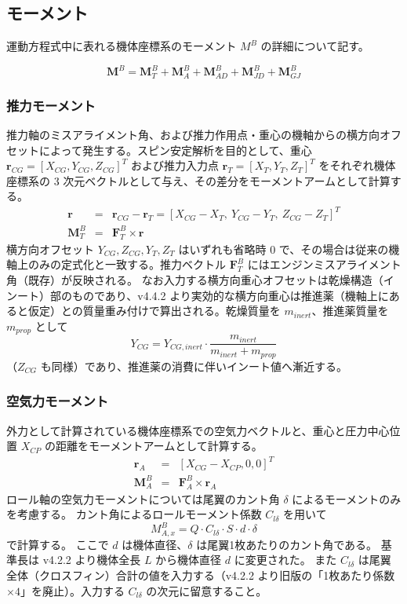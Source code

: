 ﻿\documentclass[a4paper]{jsarticle}
\begin{document}
\subsection{モーメント}
運動方程式中に表れる機体座標系のモーメント $M^B$ の詳細について記す。

\begin{equation}
\bm{M}^B = \bm{M}^B_T + \bm{M}^B_A + \bm{M}^B_{AD} + \bm{M}^B_{JD} + \bm{M}^B_{GJ}
\end{equation}

\subsubsection{推力モーメント}
推力軸のミスアライメント角、および推力作用点・重心の機軸からの横方向オフセットによって発生する。スピン安定解析を目的として、重心 $\bm{r}_{CG} = [X_{CG}, Y_{CG}, Z_{CG}]^T$ および推力入力点 $\bm{r}_T = [X_T, Y_T, Z_T]^T$ をそれぞれ機体座標系の 3 次元ベクトルとして与え、その差分をモーメントアームとして計算する。
\begin{eqnarray}
\bm{r} &=& \bm{r}_{CG} - \bm{r}_T = [X_{CG} - X_T,\ Y_{CG} - Y_T,\ Z_{CG} - Z_T]^T \\
\bm{M}^B_T &=& \bm{F}^B_T \times \bm{r}
\end{eqnarray}
横方向オフセット $Y_{CG}, Z_{CG}, Y_T, Z_T$ はいずれも省略時 0 で、その場合は従来の機軸上のみの定式化と一致する。推力ベクトル $\bm{F}^B_T$ にはエンジンミスアライメント角（既存）が反映される。
なお入力する横方向重心オフセットは乾燥構造（インート）部のものであり、v4.4.2 より実効的な横方向重心は推進薬（機軸上にあると仮定）との質量重み付けで算出される。乾燥質量を $m_{inert}$、推進薬質量を $m_{prop}$ として
\begin{equation}
Y_{CG} = Y_{CG,inert} \cdot \frac{m_{inert}}{m_{inert} + m_{prop}}
\end{equation}
（$Z_{CG}$ も同様）であり、推進薬の消費に伴いインート値へ漸近する。

\subsubsection{空気力モーメント}
外力として計算されている機体座標系での空気力ベクトルと、重心と圧力中心位置 $X_{CP}$ の距離をモーメントアームとして計算する。
\begin{eqnarray}
\bm{r}_A &=& [X_{CG} - X_{CP}, 0, 0]^T \\
\bm{M}^B_A &=& \bm{F}^B_A \times \bm{r}_A
\end{eqnarray}
ロール軸の空気力モーメントについては尾翼のカント角 $\delta$ によるモーメントのみを考慮する。
カント角によるロールモーメント係数 $C_{l\delta}$ を用いて
\begin{equation}
M^B_{A,x} = Q \cdot C_{l\delta} \cdot S \cdot d \cdot \delta
\end{equation}
で計算する。
ここで $d$ は機体直径、$\delta$ は尾翼1枚あたりのカント角である。
基準長は v4.2.2 より機体全長 $L$ から機体直径 $d$ に変更された。
また $C_{l\delta}$ は尾翼全体（クロスフィン）合計の値を入力する（v4.2.2 より旧版の「1枚あたり係数 $\times 4$」を廃止）。入力する $C_{l\delta}$ の次元に留意すること。
\end{document}
